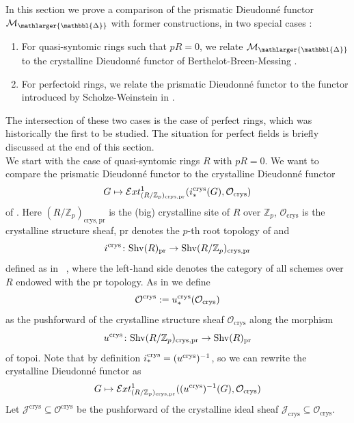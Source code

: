\documentclass{amsart}
\newcommand{\prism}{{\mathlarger{\mathbbl{\Delta}}}}
\theoremstyle{plain}
\theoremstyle{definition}
\newcommand{\crys}{\mathrm{crys}}
\newcommand{\Z}{\mathbb{Z}}
\newcommand{\red}[1]{{\color{black} #1}}
\newcommand{\blue}[1]{{\color{black}#1}}
\begin{document}
In this section we prove a comparison of the prismatic Dieudonn\'e functor \red{$\mathcal{M}_{\prism}$} with former constructions, in two special cases :
\begin{enumerate}
\item For quasi-syntomic rings such that $pR=0$, we relate $\mathcal{M}_{\prism}$ to the crystalline Dieudonn\'e functor of Berthelot-Breen-Messing \cite{berthelot_breen_messing_theorie_de_dieudonne_cristalline_II}. 
\item For perfectoid rings, we relate the prismatic Dieudonn\'e functor to the functor introduced by Scholze-Weinstein in \cite[Appendix to Lecture XVII]{scholze2020berkeley}. 
\end{enumerate}
The intersection of these two cases is the case of perfect rings, which was historically the first to be studied. The situation for perfect fields is briefly discussed at the end of this section.
\\

We start with the case of quasi-syntomic rings $R$ with $pR=0$. We want to compare the prismatic Dieudonn\'e functor to the crystalline Dieudonn\'e functor
$$
G\mapsto \mathcal{E}xt^1_{(R/\Z_p)_{\mathrm{crys},\mathrm{pr}}}(i_*^{\rm crys}(G),\mathcal{O}_{\mathrm{crys}})
$$
of \cite{berthelot_breen_messing_theorie_de_dieudonne_cristalline_II}.
Here $(R/\Z_p)_{\crys,\mathrm{pr}}$ is the (big) crystalline site of $R$ over $\Z_p$, $\mathcal{O}_{\mathrm{crys}}$ is the crystalline structure sheaf, \red{$\mathrm{pr}$ denotes the $p$-th root topology of \cite[Definition 7.2]{lau_divided_dieudonne_crystals}} and
$$
i^{\rm crys} \colon \mathrm{Shv}(R)_{\mathrm{pr}}\to \mathrm{Shv}(R/\Z_p)_{\mathrm{crys},\mathrm{pr}}
$$
\blue{defined as in \ \cite[Lemma 8.1]{lau_divided_dieudonne_crystals}}, \red{where the left-hand side denotes the category of all schemes over $R$ endowed with the pr topology}. As in \cite[Section 8]{lau_divided_dieudonne_crystals} we define
$$
\mathcal{O}^{\mathrm{crys}}:=u_\ast^{\rm crys}(\mathcal{O}_{\mathrm{crys}})
$$
as the pushforward of the crystalline structure sheaf $\mathcal{O}_{\mathrm{crys}}$ along the morphism
$$
u^{\rm crys} \colon \mathrm{Shv}(R/\Z_p)_{\crys,\mathrm{pr}}\to \mathrm{Shv}(R)_{\mathrm{pr}}
$$ of topoi. Note that by definition $i_*^{\rm crys}=(u^{\mathrm{crys}})^{-1}$, so we can rewrite the crystalline Dieudonn\'e functor as
\[ G\mapsto \mathcal{E}xt^1_{(R/\Z_p)_{\mathrm{crys},\mathrm{pr}}}((u^{\rm crys})^{-1}(G),\mathcal{O}_{\mathrm{crys}}) \]
Let $\mathcal{J}^\crys\subseteq \mathcal{O}^{\crys}$ be the pushforward of the crystalline ideal sheaf $\mathcal{J}_{\mathrm{crys}}\subseteq \mathcal{O}_{\mathrm{crys}}$.
\end{document}
